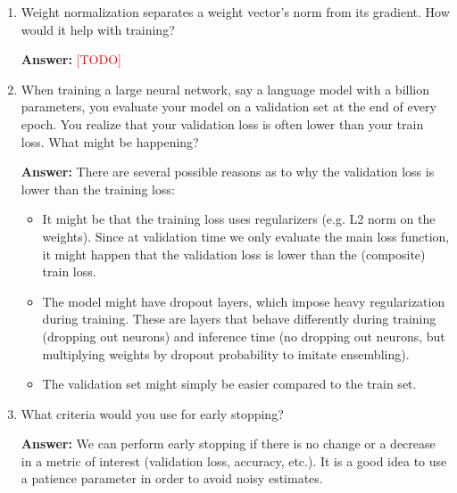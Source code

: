 \documentclass{article}
\newenvironment{QandA}{\begin{enumerate}[label=\arabic*.]}{\end{enumerate}}
\newenvironment{answer}{\par\normalfont \textbf{Answer:}}{}
\newcommand{\todo}{\textcolor{red}{[TODO]}}
\begin{document}
\begin{QandA}
    \item Weight normalization separates a weight vector’s norm from its gradient. How would it help with training?
    \begin{answer}
        \todo
    \end{answer}

    \item When training a large neural network, say a language model with a billion parameters, you evaluate your model on a validation set at the end of every epoch. You realize that your validation loss is often lower than your train loss. What might be happening?
    \begin{answer}
        There are several possible reasons as to why the validation loss is lower than the training loss:
        \begin{itemize}
            \item It might be that the training loss uses regularizers (e.g. L2 norm on the weights). Since at validation time we only evaluate the main loss function, it might happen that the validation loss is lower than the (composite) train loss. 
            \item The model might have dropout layers, which impose heavy regularization during training. These are layers that behave differently during training (dropping out neurons) and inference time (no dropping out neurons, but multiplying weights by dropout probability to imitate ensembling). 
            \item The validation set might simply be easier compared to the train set.
        \end{itemize}
    \end{answer}

    \item What criteria would you use for early stopping?
    \begin{answer}
        We can perform early stopping if there is no change or a decrease in a metric of interest (validation loss, accuracy, etc.). It is a good idea to use a patience parameter in order to avoid noisy estimates. 
    \end{answer}


\end{QandA}
\end{document}
